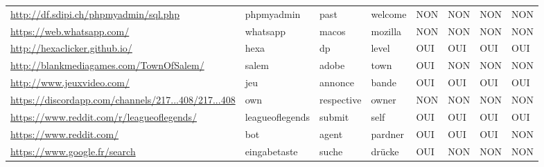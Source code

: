 \begin{figure}
\begin{tabular}{llllllll}
\scriptsize \url{http://df.sdipi.ch/phpmyadmin/sql.php}                 & phpmyadmin      & past                     & welcome        & \cellcolor[HTML]{FFCCC9}NON & \cellcolor[HTML]{FFCCC9}NON & \cellcolor[HTML]{FFCCC9}NON & \cellcolor[HTML]{FFCCC9}NON \\
\scriptsize \url{https://web.whatsapp.com/}                             & whatsapp        & macos                    & mozilla        & \cellcolor[HTML]{FFCCC9}NON & \cellcolor[HTML]{FFCCC9}NON & \cellcolor[HTML]{FFCCC9}NON & \cellcolor[HTML]{FFCCC9}NON \\
\scriptsize \url{http://hexaclicker.github.io/}                         & hexa            & dp                       & level          & \cellcolor[HTML]{9AFF99}OUI & \cellcolor[HTML]{9AFF99}OUI & \cellcolor[HTML]{9AFF99}OUI & \cellcolor[HTML]{9AFF99}OUI \\
\scriptsize \url{http://blankmediagames.com/TownOfSalem/}              & salem           & adobe                    & town           & \cellcolor[HTML]{9AFF99}OUI & \cellcolor[HTML]{FFCCC9}NON & \cellcolor[HTML]{FFCCC9}NON & \cellcolor[HTML]{FFCCC9}NON \\
\scriptsize \url{http://www.jeuxvideo.com/}                             & jeu             & annonce                  & bande          & \cellcolor[HTML]{9AFF99}OUI & \cellcolor[HTML]{9AFF99}OUI & \cellcolor[HTML]{9AFF99}OUI & \cellcolor[HTML]{9AFF99}OUI \\
\scriptsize \url{https://discordapp.com/channels/217...408/217...408}   & own             & respective               & owner          & \cellcolor[HTML]{FFCCC9}NON & \cellcolor[HTML]{FFCCC9}NON & \cellcolor[HTML]{FFCCC9}NON & \cellcolor[HTML]{FFCCC9}NON \\
\scriptsize \url{https://www.reddit.com/r/leagueoflegends/}             & leagueoflegends & submit                   & self           & \cellcolor[HTML]{9AFF99}OUI & \cellcolor[HTML]{9AFF99}OUI & \cellcolor[HTML]{9AFF99}OUI & \cellcolor[HTML]{9AFF99}OUI \\
\scriptsize \url{https://www.reddit.com/}                               & bot             & agent                    & pardner        & \cellcolor[HTML]{9AFF99}OUI & \cellcolor[HTML]{9AFF99}OUI & \cellcolor[HTML]{9AFF99}OUI & \cellcolor[HTML]{FFCCC9}NON \\
\scriptsize \url{https://www.google.fr/search}                          & eingabetaste    & suche                    & drücke         & \cellcolor[HTML]{9AFF99}OUI & \cellcolor[HTML]{FFCCC9}NON & \cellcolor[HTML]{FFCCC9}NON & \cellcolor[HTML]{FFCCC9}NON \\

\end{tabular}
\end{figure}
